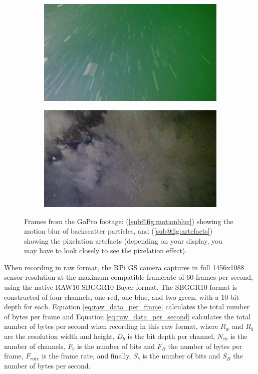 \begin{figure}[H]
    \centering
    \begin{subfigure}{.49\textwidth}
        \centering
        \includegraphics[width=1\linewidth]{assets/gopro_footage_streaks.jpg}
        \caption{}
        \label{fig:motionblur}
    \end{subfigure}
    \hfill
    \begin{subfigure}{.49\textwidth}
        \centering
        \includegraphics[width=1\linewidth]{assets/gopro_footage_artefacts.png}
        \caption{}
        \label{fig:artefacts}
    \end{subfigure}
    \caption{Frames from the GoPro footage: (\ref{sub@fig:motionblur}) showing the motion blur of backscatter particles, and (\ref{sub@fig:artefacts}) showing the pixelation artefacts (depending on your display, you may have to look closely to see the pixelation effect).}
    \label{fig:gopro}
\end{figure}

When recording in raw format, the RPi GS camera captures in full 1456x1088 sensor resolution at the maximum compatible framerate of 60 frames per second, using the native RAW10 SBGGR10 Bayer format. The SBGGR10 format is constructed of four channels, one red, one blue, and two green, with a 10-bit depth for each. Equation \ref{eq:raw_data_per_frame} calculates the total number of bytes per frame and Equation \ref{eq:raw_data_per_second} calculates the total number of bytes per second when recording in this raw format, where $R_w$ and $R_h$ are the resolution width and height, $D_b$ is the bit depth per channel, $N_{ch}$ is the number of channels, $F_b$ is the number of bits and $F_B$ the number of bytes per frame, $F_{rate}$ is the frame rate, and finally, $S_b$ is the number of bits and $S_B$ the number of bytes per second.

